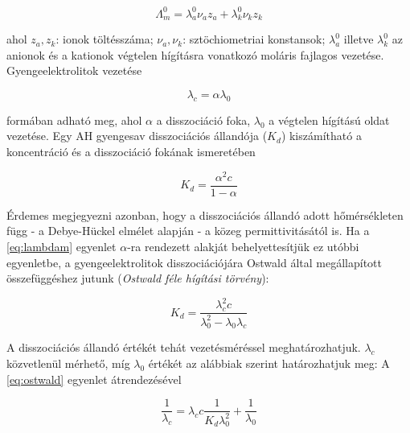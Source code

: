 \begin{equation}
\label{eq:kohlrausch2}
	\Lambda _m^0
	=
	\lambda _a^0 \nu _a z_a + \lambda _k^0 \nu _k z_k
\end{equation}

ahol $z_a, z_k$: ionok töltésszáma; $\nu _a, \nu _k$: sztöchiometriai konstansok; $\lambda _a^0$ illetve $\lambda _k^0$ az anionok és a kationok végtelen hígításra vonatkozó moláris fajlagos vezetése.
Gyengeelektrolitok vezetése

\begin{equation}
\label{eq:lambdam}
        \lambda_c
        =
        \alpha
	\lambda_0
\end{equation}

formában adható meg, ahol $\alpha$ a disszociáció foka, $\lambda _0$ a végtelen hígítású oldat vezetése.
Egy AH gyengesav disszociációs állandója ($K_d$) kiszámítható a koncentráció és a disszociáció fokának ismeretében

\begin{equation}
\label{eq:kd}
        K_d
        =
        \frac{\alpha^2 c}{1-\alpha}
\end{equation}

Érdemes megjegyezni azonban, hogy a disszociációs állandó adott hőmérsékleten függ - a Debye-Hückel elmélet alapján - a közeg permittivitásától is.
Ha a \ref{eq:lambdam} egyenlet $\alpha$-ra rendezett alakját behelyettesítjük ez utóbbi egyenletbe, a gyengeelektrolitok disszociációjára Ostwald által megállapított összefüggéshez jutunk (\emph{Ostwald féle hígítási törvény}):

\begin{equation}
\label{eq:ostwald}
        K_d
        =
        \frac{\lambda_c^2 c}{\lambda_0^2 - \lambda_0\lambda_c}
\end{equation}

A disszociációs állandó értékét tehát vezetésméréssel meghatározhatjuk. 
$\lambda_c$ közvetlenül mérhető, míg $\lambda_0$ értékét az alábbiak szerint határozhatjuk meg:
A \ref{eq:ostwald} egyenlet átrendezésével

\begin{equation}
\label{eq:ostwald2}
        \frac{1}{\lambda_c}
        =
	\lambda_c
	c
	\frac{1}{K_d \lambda_0^2}
	+\frac{1}{\lambda_0}
\end{equation}

